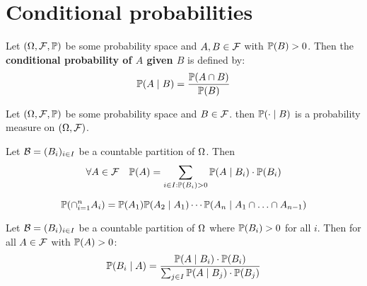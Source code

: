 \section{Conditional probabilities}

\begin{definition*}
  Let \((\O, \F, \P)\) be some probability space and \(A, B \in \F\) with \(\P(B) > 0\). Then the \textbf{conditional probability of \(A\) given \(B\)} is defined by:
  \[\P(A \mid B) = \frac{\P(A \cap B)}{\P(B)}\]
\end{definition*}

\begin{proposition}
  Let \((\O, \F, \P)\) be some probability space and \(B \in \F\). then \(\P(\cdot \mid B)\) is a probability measure on \((\O, \F)\).
\end{proposition}

\begin{theorem*}
  Let \(\B = (B_i)_{i \in I}\) be a countable partition of \(\O\). Then
  \[\forall A \in \F \quad \P(A) = \sum_{i \in I: \P(B_i) > 0} \P(A \mid B_i) \cdot \P(B_i)\]
\end{theorem*}

\begin{theorem*} \vspace{-5pt}
 \[ \P(\cap_{i=1}^n A_i) = \P(A_1) \P(A_2 \mid A_1) \cdots \P(A_n \mid A_1 \cap \ldots \cap A_{n-1})\]
\end{theorem*}

\begin{theorem*}
  Let \(\B = (B_i)_{i \in I}\) be a countable partition of \(\O\) where \(\P(B_i) > 0\) for all \(i\). Then for all \(A \in \F\) with \(\P(A) > 0\):
  \[\P(B_i \mid A) = \frac{\P(A \mid B_i) \cdot \P(B_i)}{\sum_{j \in I} \P(A \mid B_j) \cdot \P(B_j)}\]
\end{theorem*}

